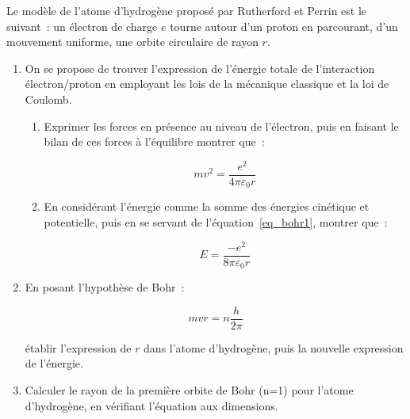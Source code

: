 

Le mod\`ele de l'atome d'hydrog\`ene propos\'e par Rutherford et Perrin est le suivant~:
un \'electron de charge $e$ tourne autour d'un proton en parcourant, d'un mouvement
uniforme, une orbite circulaire de rayon $r$.

\begin{enumerate}[\bf 1)]

\item On se propose de trouver l'expression de l'\'energie totale de l'interaction \'electron/proton
en employant les lois de la m\'ecanique classique et la loi de Coulomb.
\begin{enumerate}
\item Exprimer les forces en pr\'esence au niveau de l'\'electron, puis en faisant le bilan de ces forces
\`a l'\'equilibre montrer que~:

\begin{equation}
\label{eq_bohr1}
mv^2 = \frac{e^2}{4 \pi \varepsilon_0 r}
\end{equation}

\item En consid\'erant l'\'energie comme la somme des \'energies cin\'etique et potentielle,
puis en se servant de l'\'equation~\ref{eq_bohr1}, montrer que~:

\begin{equation}
\label{eq_bohr2}
E = \frac{-e^2}{8 \pi \varepsilon_0 r}
\end{equation}

\end{enumerate}

\item En  posant l'hypoth\`ese de Bohr~:

\begin{equation}
\label{eq_bohr3}
mvr = n\frac{h}{2\pi}
\end{equation}

\'etablir l'expression de $r$ dans l'atome d'hydrog\`ene, puis la nouvelle expression de l'\'energie.

\item  Calculer le rayon de la premi\`ere orbite de Bohr (n=1) pour l'atome d'hydrog\`ene,
en v\'erifiant l'\'equation aux dimensions.

\end{enumerate}

